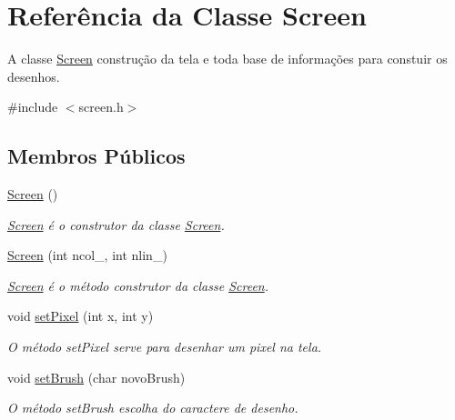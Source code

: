 \hypertarget{class_screen}{}\section{Referência da Classe Screen}
\label{class_screen}


A classe \mbox{\hyperlink{class_screen}{Screen}} construção da tela e toda base de informações para constuir os desenhos.  




{\ttfamily \#include $<$screen.\+h$>$}

\subsection*{Membros Públicos}
\begin{DoxyCompactItemize}
\item 
\mbox{\label{class_screen_ae7576476fc6e6a6eaa66389fdc41fe72}} 
\mbox{\hyperlink{class_screen_ae7576476fc6e6a6eaa66389fdc41fe72}{Screen}} ()
\begin{DoxyCompactList}\small\item\em \mbox{\hyperlink{class_screen}{Screen}} é o construtor da classe \mbox{\hyperlink{class_screen}{Screen}}. \end{DoxyCompactList}\item 
\mbox{\hyperlink{class_screen_a085b573146de76e3750a579b4dc599dd}{Screen}} (int ncol\+\_\+, int nlin\+\_\+)
\begin{DoxyCompactList}\small\item\em \mbox{\hyperlink{class_screen}{Screen}} é o método construtor da classe \mbox{\hyperlink{class_screen}{Screen}}. \end{DoxyCompactList}\item 
void \mbox{\hyperlink{class_screen_ae6bea81c57a22d226507c3c26fa95ee0}{set\+Pixel}} (int x, int y)
\begin{DoxyCompactList}\small\item\em O método set\+Pixel serve para desenhar um pixel na tela. \end{DoxyCompactList}\item 
\mbox{\label{class_screen_ac17e1ecd10a3f740f7e5be3a02f57537}} 
void \mbox{\hyperlink{class_screen_ac17e1ecd10a3f740f7e5be3a02f57537}{set\+Brush}} (char novo\+Brush)
\begin{DoxyCompactList}\small\item\em O método set\+Brush escolha do caractere de desenho. \end{DoxyCompactList}\item 

\end{DoxyCompactItemize}
